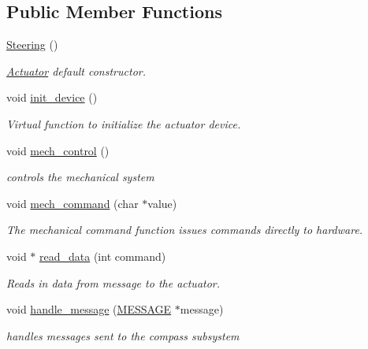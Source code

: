 \subsection*{Public Member Functions}
\begin{DoxyCompactItemize}
\item 
\hyperlink{classSteering_a45a5ff1a1869073a2165680f853b9c41}{Steering} ()
\begin{DoxyCompactList}\small\item\em \hyperlink{classActuator}{Actuator} default constructor. \end{DoxyCompactList}\item 
void \hyperlink{classSteering_a57a8011d7d5a4ca608b1b140e21233cb}{init\-\_\-device} ()
\begin{DoxyCompactList}\small\item\em Virtual function to initialize the actuator device. \end{DoxyCompactList}\item 
\hypertarget{classSteering_a5b7b0a053607ad891b7d2826093da6ac}{void \hyperlink{classSteering_a5b7b0a053607ad891b7d2826093da6ac}{mech\-\_\-control} ()}\label{classSteering_a5b7b0a053607ad891b7d2826093da6ac}

\begin{DoxyCompactList}\small\item\em controls the mechanical system \end{DoxyCompactList}\item 
void \hyperlink{classSteering_a0ae09490e872d21d211ddfdc446d14d1}{mech\-\_\-command} (char $\ast$value)
\begin{DoxyCompactList}\small\item\em The mechanical command function issues commands directly to hardware. \end{DoxyCompactList}\item 
void $\ast$ \hyperlink{classSteering_afda4f2951e5be114abf988a8e5943a96}{read\-\_\-data} (int command)
\begin{DoxyCompactList}\small\item\em Reads in data from message to the actuator. \end{DoxyCompactList}\item 
\hypertarget{classSteering_a29e46d1b87ecda7807452ad67005efe1}{void \hyperlink{classSteering_a29e46d1b87ecda7807452ad67005efe1}{handle\-\_\-message} (\hyperlink{SUBSYS__COMMANDS_8h_ad814416fc1a8c675bea2687d96088a8f}{M\-E\-S\-S\-A\-G\-E} $\ast$message)}\label{classSteering_a29e46d1b87ecda7807452ad67005efe1}

\begin{DoxyCompactList}\small\item\em handles messages sent to the compass subsystem \end{DoxyCompactList}\end{DoxyCompactItemize}
